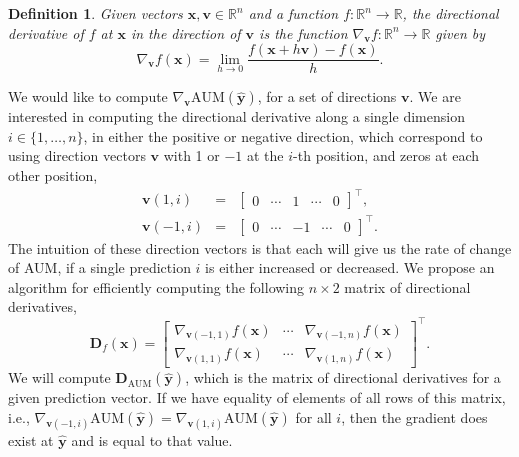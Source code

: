 \documentclass{article}
\newtheorem{definition}{Definition}
\begin{document}
\begin{definition}
Given vectors $\mathbf x,\mathbf v\in\mathbb R^n$ and a function $f:\mathbb R^n\rightarrow \mathbb R$, the directional derivative of $f$ at $\mathbf x$ in the direction of $\mathbf v$ is the function $\nabla_{\mathbf v} f: \mathbb R^n \rightarrow \mathbb R$ given by
\begin{equation}
\label{eq:directional-derivative}
    \nabla_{\mathbf v} f(\mathbf x) = 
    \lim_{h\rightarrow 0}
    \frac{f(\mathbf x + h\mathbf v) - 
    f(\mathbf x)}{h}.
\end{equation}
\end{definition}
We would like to compute $\nabla_{\mathbf v}\text{AUM}(\mathbf{\hat y})$, for a set of directions $\mathbf v$.
We are interested in computing the directional derivative along a single dimension $i\in\{1,\dots,n\}$, in either the positive or negative direction, which correspond to using direction vectors $\mathbf v$ with 1 or $-1$ at the $i$-th position, and zeros at each other position, 
\begin{eqnarray}
\mathbf v(1, i) &=& \left[\begin{array}{ccccc}
0 & \cdots & 1 & \cdots & 0
\end{array}\right]^\intercal,
\\
\mathbf v(-1, i) &=& \left[\begin{array}{ccccc}
0 & \cdots & -1 & \cdots & 0
\end{array}\right]^\intercal.
\end{eqnarray}
The intuition of these direction vectors is that each will give us the rate of change of AUM, if a single prediction $i$ is either increased or decreased.
We propose an algorithm for efficiently computing the following $n\times 2$ matrix of directional derivatives,
\begin{equation}
\mathbf D_f(\mathbf x) = 
    \left[\begin{array}{ccc}
\nabla_{\mathbf v(-1,1)} f(\mathbf x) &
\cdots &
\nabla_{\mathbf v(-1,n)} f(\mathbf x) \\
\nabla_{\mathbf v(1,1)} f(\mathbf x) &
\cdots &
\nabla_{\mathbf v(1,n)} f(\mathbf x) 
    \end{array}\right]^\intercal.
\end{equation}
We will compute $\mathbf D_\text{AUM}(\mathbf {\hat y})$, which is the matrix of directional derivatives for a given prediction vector.
If we have equality of elements of all rows of this matrix, i.e., $
\nabla_{\mathbf v(-1,i)} \text{AUM}(\mathbf {\hat y})
=
\nabla_{\mathbf v(1,i)} \text{AUM}(\mathbf {\hat y})$ for all $i$, then the gradient does exist at $\mathbf {\hat y}$ and is equal to that value.
\end{document}
